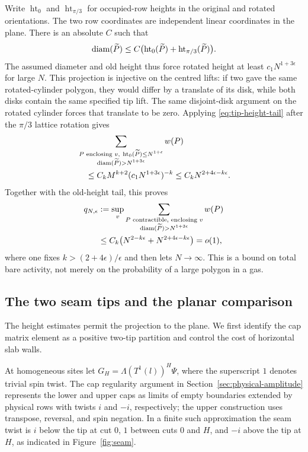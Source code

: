 Write $\operatorname{ht}_0$ and $\operatorname{ht}_{\pi/3}$ for occupied-row
heights in the original and rotated orientations. The two row
coordinates are independent linear coordinates in the plane. There is
an absolute $C$ such that
\[
 \operatorname{diam}(\widetilde P)\le C\bigl(\operatorname{ht}_0(\widetilde P)
                         +\operatorname{ht}_{\pi/3}(\widetilde P)\bigr).
\]
The assumed diameter and old height thus force rotated height at least
$c_1N^{1+3\epsilon}$ for large $N$. This projection is injective on the
centred lifts: if two gave the same rotated-cylinder polygon, they would
differ by a translate of its disk, while both disks contain the same
specified tip lift. The same disjoint-disk argument on the rotated
cylinder forces that translate to be zero. Applying
\eqref{eq:tip-height-tail} after the $\pi/3$ lattice
rotation gives
\[
 \begin{aligned}
 &\sum_{\substack{P\text{ enclosing }v,\ \operatorname{ht}_0(\widetilde P)\le N^{1+\epsilon}\\
                  \diam(\widetilde P)>N^{1+3\epsilon}}}w(P)\\
 &\quad\le C_k M^{k+2}(c_1N^{1+3\epsilon})^{-k}
 \le C_kN^{2+4\epsilon-k\epsilon}.
 \end{aligned}
\]
Together with the old-height tail, this proves
\begin{equation}\label{eq:tip-diameter-tail}
 \begin{split}
 q_{N,\epsilon}&:=
 \sup_v\sum_{\substack{P\text{ contractible, enclosing }v\\
                        \operatorname{diam}(\widetilde P)>N^{1+3\epsilon}}}w(P)\\
 &\le C_k\bigl(N^{2-k\epsilon}+N^{2+4\epsilon-k\epsilon}\bigr)=o(1),
 \end{split}
\end{equation}
where one fixes $k>(2+4\epsilon)/\epsilon$ and then lets $N\to\infty$.
This is a bound on total bare activity, not merely on the probability
of a large polygon in a gas.

\subsection{The two seam tips and the planar comparison}

The height estimates permit the projection to the plane. We first
identify the cap matrix element as a positive two-tip partition and
control the cost of horizontal slab walls.

At homogeneous sites let $G_H=\Lambda(T^1(l))^H\Psi$, where the
superscript $1$ denotes trivial spin twist. The cap regularity argument
in Section~\ref{sec:physical-amplitude} represents the lower and upper
caps as limits of empty boundaries extended by physical rows with twists
$i$ and $-i$, respectively; the upper construction uses transpose,
reversal, and spin negation. In a finite such approximation the seam
twist is $i$ below the tip at cut $0$, $1$ between cuts $0$ and $H$, and
$-i$ above the tip at $H$, as indicated in Figure~\ref{fig:seam}.

